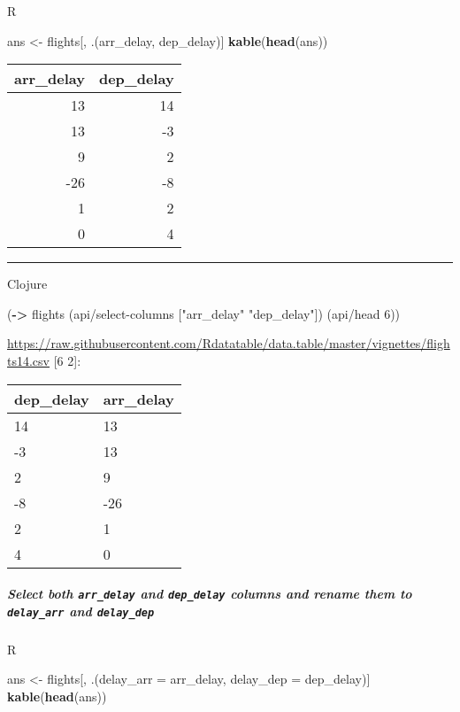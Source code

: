 \documentclass[]{article}
\newenvironment{Shaded}{\begin{snugshade}}{\end{snugshade}}
\newcommand{\DataTypeTok}[1]{\textcolor[rgb]{0.13,0.29,0.53}{#1}}
\newcommand{\DecValTok}[1]{\textcolor[rgb]{0.00,0.00,0.81}{#1}}
\newcommand{\KeywordTok}[1]{\textcolor[rgb]{0.13,0.29,0.53}{\textbf{#1}}}
\newcommand{\NormalTok}[1]{#1}
\newcommand{\StringTok}[1]{\textcolor[rgb]{0.31,0.60,0.02}{#1}}
\let\oldsubparagraph\subparagraph
\renewcommand{\subparagraph}[1]{\oldsubparagraph{#1}\mbox{}}
\begin{document}
R

\begin{Shaded}
\begin{Highlighting}[]
\NormalTok{ans <-}\StringTok{ }\NormalTok{flights[, .(arr_delay, dep_delay)]}
\KeywordTok{kable}\NormalTok{(}\KeywordTok{head}\NormalTok{(ans))}
\end{Highlighting}
\end{Shaded}

\begin{longtable}[]{@{}rr@{}}
\toprule
arr\_delay & dep\_delay\tabularnewline
\midrule
\endhead
13 & 14\tabularnewline
13 & -3\tabularnewline
9 & 2\tabularnewline
-26 & -8\tabularnewline
1 & 2\tabularnewline
0 & 4\tabularnewline
\bottomrule
\end{longtable}

\begin{center}\rule{0.5\linewidth}{0.5pt}\end{center}

Clojure

\begin{Shaded}
\begin{Highlighting}[]
\NormalTok{(}\KeywordTok{->}\NormalTok{ flights}
\NormalTok{    (api/select-columns [}\StringTok{"arr_delay"} \StringTok{"dep_delay"}\NormalTok{])}
\NormalTok{    (api/head }\DecValTok{6}\NormalTok{))}
\end{Highlighting}
\end{Shaded}

\url{https://raw.githubusercontent.com/Rdatatable/data.table/master/vignettes/flights14.csv}
{[}6 2{]}:

\begin{longtable}[]{@{}ll@{}}
\toprule
dep\_delay & arr\_delay\tabularnewline
\midrule
\endhead
14 & 13\tabularnewline
-3 & 13\tabularnewline
2 & 9\tabularnewline
-8 & -26\tabularnewline
2 & 1\tabularnewline
4 & 0\tabularnewline
\bottomrule
\end{longtable}

\hypertarget{select-both-arr_delay-and-dep_delay-columns-and-rename-them-to-delay_arr-and-delay_dep}{%
\subparagraph{\texorpdfstring{Select both \texttt{arr\_delay} and
\texttt{dep\_delay} columns and rename them to \texttt{delay\_arr} and
\texttt{delay\_dep}}{Select both arr\_delay and dep\_delay columns and rename them to delay\_arr and delay\_dep}}\label{select-both-arr_delay-and-dep_delay-columns-and-rename-them-to-delay_arr-and-delay_dep}}

R

\begin{Shaded}
\begin{Highlighting}[]
\NormalTok{ans <-}\StringTok{ }\NormalTok{flights[, .(}\DataTypeTok{delay_arr =}\NormalTok{ arr_delay, }\DataTypeTok{delay_dep =}\NormalTok{ dep_delay)]}
\KeywordTok{kable}\NormalTok{(}\KeywordTok{head}\NormalTok{(ans))}
\end{Highlighting}
\end{Shaded}
\end{document}
